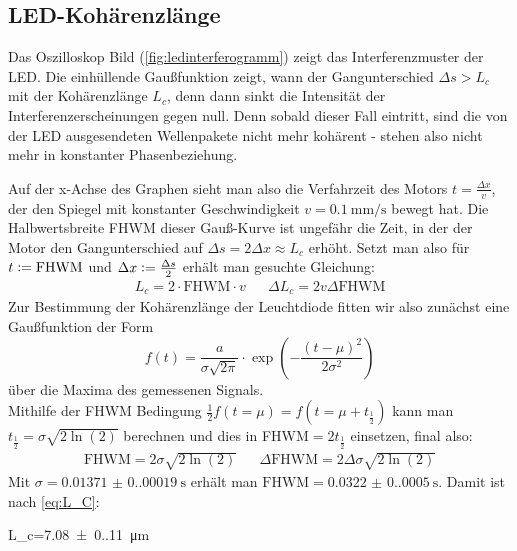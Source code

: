 \subsection{LED-Kohärenzlänge}
Das Oszilloskop Bild (\cref{fig:ledinterferogramm}) zeigt das Interferenzmuster der LED. Die einhüllende Gaußfunktion zeigt, wann der Gangunterschied \(\Delta s>L_c\) mit der Kohärenzlänge \(L_c\), denn dann sinkt die Intensität der Interferenzerscheinungen gegen null. Denn sobald dieser Fall eintritt, sind die von der LED ausgesendeten Wellenpakete nicht mehr kohärent - stehen also nicht mehr in konstanter Phasenbeziehung. 

Auf der x-Achse des Graphen sieht man also die Verfahrzeit des Motors \(t=\frac{\Delta x}{v}\), der den Spiegel mit konstanter Geschwindigkeit \(v=\qty{0.1}{\milli\m\per\s}\) bewegt hat. Die Halbwertsbreite FHWM dieser Gauß-Kurve ist ungefähr die Zeit, in der der Motor den Gangunterschied auf \(\Delta s=2\Delta x\approx L_c\) erhöht. Setzt man also für \(t\vcentcolon=\text{FHWM}\) und \(\Delta x\vcentcolon=\frac{\Delta s}{2}\) erhält man gesuchte Gleichung:
\begin{align}
    \label{eq:L_C}
    L_c=2\cdot \text{FHWM}\cdot v&&\Delta L_c=2v\Delta \text{FHWM}
\end{align}
Zur Bestimmung der Kohärenzlänge der Leuchtdiode fitten wir also zunächst eine Gaußfunktion der Form
\begin{equation}
    f(t) = \frac{a}{\sigma \sqrt{2\pi}} \cdot \exp \left( -\frac{(t - \mu)^2}{2\sigma^2} \right)
\end{equation}
über die Maxima des gemessenen Signals.\\
Mithilfe der FHWM Bedingung \(\frac{1}{2}f(t=\mu)=f(t=\mu+t_\frac{1}{2})\) kann man \(t_\frac{1}{2}=\sigma\sqrt{2\ln(2)}\) berechnen und dies in FHWM\(=2t_\frac{1}{2}\) einsetzen, final also:
\begin{align}
    \text{FHWM}=2\sigma\sqrt{2\ln(2)}&&\Delta \text{FHWM}=2\Delta \sigma\sqrt{2\ln(2)}
\end{align}
Mit \(\sigma=\qty{0.01371(0.00019)}{\s}\) erhält man \(\text{FHWM}=\qty{0.0322(0.0005)}{\s}\). Damit ist nach \cref{eq:L_C}:
\begin{rb}
    L_c=\qty{7.08(0.11)}{\micro\m}
\end{rb}





